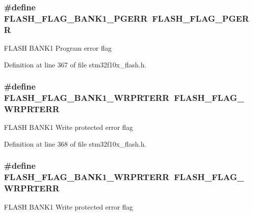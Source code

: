 \subsubsection[{\texorpdfstring{F\+L\+A\+S\+H\+\_\+\+F\+L\+A\+G\+\_\+\+B\+A\+N\+K1\+\_\+\+P\+G\+E\+RR}{FLASH_FLAG_BANK1_PGERR}}]{\setlength{\rightskip}{0pt plus 5cm}\#define F\+L\+A\+S\+H\+\_\+\+F\+L\+A\+G\+\_\+\+B\+A\+N\+K1\+\_\+\+P\+G\+E\+RR~{\bf F\+L\+A\+S\+H\+\_\+\+F\+L\+A\+G\+\_\+\+P\+G\+E\+RR}}\hypertarget{group___f_l_a_s_h___flags_gaa1056ffdd1c434a2967d5ed7c0d263be}{}\label{group___f_l_a_s_h___flags_gaa1056ffdd1c434a2967d5ed7c0d263be}
F\+L\+A\+SH B\+A\+N\+K1 Program error flag 

Definition at line 367 of file stm32f10x\+\_\+flash.\+h.

\subsubsection[{\texorpdfstring{F\+L\+A\+S\+H\+\_\+\+F\+L\+A\+G\+\_\+\+B\+A\+N\+K1\+\_\+\+W\+R\+P\+R\+T\+E\+RR}{FLASH_FLAG_BANK1_WRPRTERR}}]{\setlength{\rightskip}{0pt plus 5cm}\#define F\+L\+A\+S\+H\+\_\+\+F\+L\+A\+G\+\_\+\+B\+A\+N\+K1\+\_\+\+W\+R\+P\+R\+T\+E\+RR~{\bf F\+L\+A\+S\+H\+\_\+\+F\+L\+A\+G\+\_\+\+W\+R\+P\+R\+T\+E\+RR}}\hypertarget{group___f_l_a_s_h___flags_ga1646345adbcda773ef25785b1bdc4c43}{}\label{group___f_l_a_s_h___flags_ga1646345adbcda773ef25785b1bdc4c43}
F\+L\+A\+SH B\+A\+N\+K1 Write protected error flag 

Definition at line 368 of file stm32f10x\+\_\+flash.\+h.

\subsubsection[{\texorpdfstring{F\+L\+A\+S\+H\+\_\+\+F\+L\+A\+G\+\_\+\+B\+A\+N\+K1\+\_\+\+W\+R\+P\+R\+T\+E\+RR}{FLASH_FLAG_BANK1_WRPRTERR}}]{\setlength{\rightskip}{0pt plus 5cm}\#define F\+L\+A\+S\+H\+\_\+\+F\+L\+A\+G\+\_\+\+B\+A\+N\+K1\+\_\+\+W\+R\+P\+R\+T\+E\+RR~{\bf F\+L\+A\+S\+H\+\_\+\+F\+L\+A\+G\+\_\+\+W\+R\+P\+R\+T\+E\+RR}}\hypertarget{group___f_l_a_s_h___flags_ga1646345adbcda773ef25785b1bdc4c43}{}\label{group___f_l_a_s_h___flags_ga1646345adbcda773ef25785b1bdc4c43}
F\+L\+A\+SH B\+A\+N\+K1 Write protected error flag 

